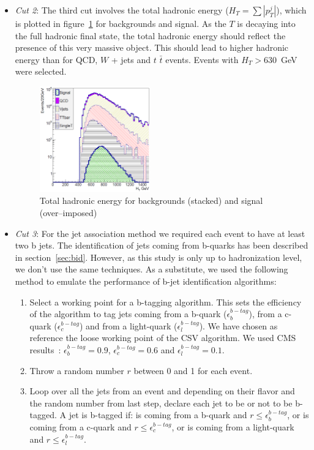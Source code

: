 \begin{itemize}
\item \textit{Cut 2}: The third cut involves the total hadronic energy ($H_{T}=\sum |p_{T}^{j}|$), which is plotted in figure~\ref{fig:Var2} for backgrounds and signal. As the $T$ is decaying into the full hadronic final state, the total hadronic energy should reflect the presence of this very massive object. This should lead to higher hadronic energy than for QCD, $W$ + jets and $t$ $\bar{t}$ events. Events with $H_{T}>630$~GeV were selected.

\begin{figure}[!Hhtbp]
  \begin{center}
    \includegraphics[width=0.45\textwidth]{figs/Pheno/HT.png}
    \caption{Total hadronic energy for backgrounds (stacked) and signal (over--imposed)}
    \label{fig:Var2}
  \end{center}
\end{figure}

\item \textit{Cut 3}: For the jet association method we required each event to have at least two b jets. The identification of jets coming from b-quarks has been described in section~\ref{sec:bid}. However, as this study is only up to hadronization level, we don't use the same techniques. As a substitute, we used the following method to emulate the performance of b-jet identification algorithms:
  \begin{enumerate}
  \item Select a working point for a b-tagging algorithm. This sets the efficiency of the algorithm to tag jets coming from a b-quark ($\epsilon^{b-tag}_{b}$), from a c-quark ($\epsilon^{b-tag}_{c}$) and from a light-quark ($\epsilon^{b-tag}_{l}$). We have chosen as reference the loose working point of the CSV algorithm. We used CMS results~\cite{CMS-PAS-BTV-13-001}: $\epsilon^{b-tag}_{b}=0.9$, $\epsilon^{b-tag}_{c}=0.6$ and $\epsilon^{b-tag}_{l}=0.1$. 
  \item Throw a random number $r$ between 0 and 1 for each event.
  \item Loop over all the jets from an event and depending on their flavor and the random number from last step, declare each jet to be or not to be b-tagged. A jet is b-tagged if: is coming from a b-quark and $r\leq\epsilon^{b-tag}_{b}$, or is coming from a c-quark and $r\leq\epsilon^{b-tag}_{c}$, or is coming from a light-quark and $r\leq\epsilon^{b-tag}_{l}$.
  \end{enumerate}


\end{itemize}
